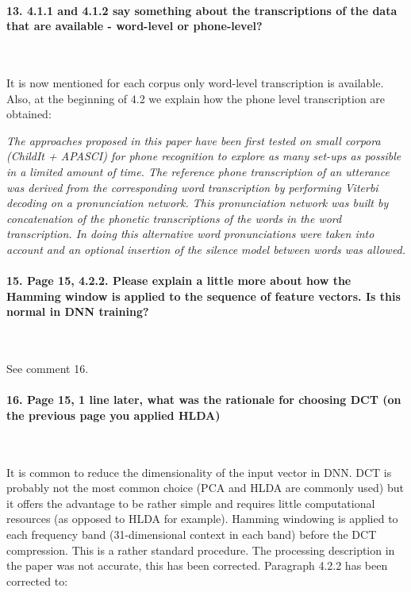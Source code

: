 \documentclass[]{article}
\begin{document}
\paragraph{13. 4.1.1 and 4.1.2 say something about the transcriptions of the data that are available - word-level or phone-level?}

~

It is now mentioned for each corpus only word-level transcription is available. Also, at the beginning of 4.2 we explain how the phone level transcription are obtained:

\textit{The approaches proposed in this paper have been first tested on small
corpora (ChildIt + APASCI) for phone recognition to explore as many
set-ups as possible in a limited amount of time.  The
reference phone transcription of an utterance was derived from the
corresponding word transcription by performing Viterbi decoding on a
pronunciation network.  This pronunciation network was built by
concatenation of the phonetic transcriptions of the words in the word
transcription.  In doing this alternative word pronunciations were
taken into account and an optional insertion of the silence model
between words was allowed.}

\paragraph{15. Page 15, 4.2.2. Please explain a little more about how the Hamming window is applied to the sequence of feature vectors. Is this normal in DNN training?}

~

See comment 16.

\paragraph{16. Page 15, 1 line later, what was the rationale for choosing DCT (on the previous page you applied HLDA)}

~

It is common to reduce the dimensionality of the input vector in DNN. DCT is probably not the most common choice (PCA and HLDA are commonly used) but it offers the advantage to be rather simple and requires little computational resources (as opposed to HLDA for example). Hamming windowing is applied to each frequency band (31-dimensional context in each band) before the DCT compression. This is a rather standard procedure. The processing description in the paper was not accurate, this has been corrected. Paragraph 4.2.2 has been corrected to:
\end{document}
